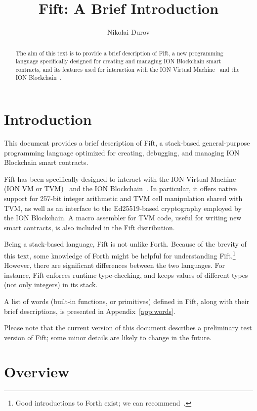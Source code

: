 \documentclass[12pt,oneside]{article}
\title{Fift: A Brief Introduction}
\author{Nikolai Durov}
\def\markbothsame#1{\fancyhead[C]{#1}}
\def\mysection#1{\section{#1}\fancyhead[C]{\textsc{Chapter \textbf{\thesection.} #1}}}
\begin{document}
\maketitle

\begin{abstract}
  The aim of this text is to provide a brief description of Fift, a new programming language specifically designed for creating and managing ION Blockchain smart contracts, and its features used for interaction with the ION Virtual Machine~\cite{TVM} and the ION Blockchain~\cite{TBC}.
\end{abstract}

\section*{Introduction}
\markbothsame{Introduction}

This document provides a brief description of Fift, a stack-based general-purpose programming language optimized for creating, debugging, and managing ION Blockchain smart contracts.

Fift has been specifically designed to interact with the ION Virtual Machine (ION VM or TVM)~\cite{TVM} and the ION Blockchain~\cite{TBC}. In particular, it offers native support for 257-bit integer arithmetic and TVM cell manipulation shared with TVM, as well as an interface to the Ed25519-based cryptography employed by the ION Blockchain. A macro assembler for TVM code, useful for writing new smart contracts, is also included in the Fift distribution.

Being a stack-based language, Fift is not unlike Forth. Because of the brevity of this text, some knowledge of Forth might be helpful for understanding Fift.\footnote{Good introductions to Forth exist; we can recommend~\cite{Brodie}.} However, there are significant differences between the two languages. For instance, Fift enforces runtime type-checking, and keeps values of different types (not only integers) in its stack.

A list of words (built-in functions, or primitives) defined in Fift, along with their brief descriptions, is presented in Appendix~\ref{app:words}.

Please note that the current version of this document describes a preliminary test version of Fift; some minor details are likely to change in the future.

\clearpage
\tableofcontents

\clearpage
\mysection{Overview}\label{sect:overview}
\end{document}
